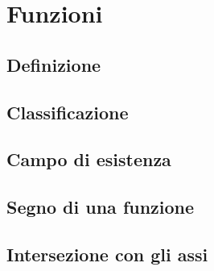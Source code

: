 \chapter{Funzioni}
\section{Definizione}
\section{Classificazione}
\section{Campo di esistenza}
\section{Segno di una funzione}
\section{Intersezione con gli assi}